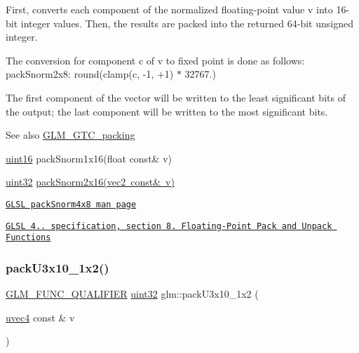 First, converts each component of the normalized floating-\/point value v into 16-\/bit integer values. Then, the results are packed into the returned 64-\/bit unsigned integer.

The conversion for component c of v to fixed point is done as follows\+: pack\+Snorm2x8\+: round(clamp(c, -\/1, +1) $\ast$ 32767.)

The first component of the vector will be written to the least significant bits of the output; the last component will be written to the most significant bits.

\begin{DoxySeeAlso}{See also}
\mbox{\hyperlink{group__gtc__packing}{G\+L\+M\+\_\+\+G\+T\+C\+\_\+packing}} 

\mbox{\hyperlink{group__gtc__type__precision_gad8c2939e1fdd8e5828b31d95c52255d5}{uint16}} pack\+Snorm1x16(float const\& v) 

\mbox{\hyperlink{group__gtc__type__precision_ga202b6a53c105fcb7e531f9b443518451}{uint32}} \mbox{\hyperlink{group__core__func__packing_ga977ab172da5494e5ac63e952afacfbe2}{pack\+Snorm2x16(vec2 const\& v)}} 

\href{http://www.opengl.org/sdk/docs/manglsl/xhtml/packSnorm4x8.xml}{\tt G\+L\+SL pack\+Snorm4x8 man page} 

\href{http://www.opengl.org/registry/doc/GLSLangSpec.4.20.8.pdf}{\tt G\+L\+SL 4.. specification, section 8. Floating-\/\+Point Pack and Unpack Functions} 
\end{DoxySeeAlso}
\mbox{\label{group__gtc__packing_gaf656d8862628f96b20de7a36eaa1fe56}} 
\subsubsection{\texorpdfstring{pack\+U3x10\+\_\+1x2()}{packU3x10\_1x2()}}
{\footnotesize\ttfamily \mbox{\hyperlink{setup_8hpp_a33fdea6f91c5f834105f7415e2a64407}{G\+L\+M\+\_\+\+F\+U\+N\+C\+\_\+\+Q\+U\+A\+L\+I\+F\+I\+ER}} \mbox{\hyperlink{group__gtc__type__precision_ga202b6a53c105fcb7e531f9b443518451}{uint32}} glm\+::pack\+U3x10\+\_\+1x2 (\begin{DoxyParamCaption}\item[{\mbox{\hyperlink{group__core__types_ga1c426d19627b32b14f0089f7f4ba7b1d}{uvec4}} const \&}]{v }\end{DoxyParamCaption})}

